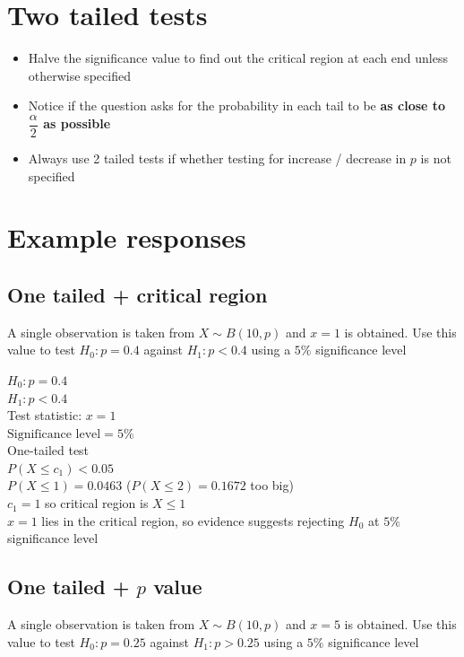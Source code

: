 \documentclass[oneside,fleqn,11pt]{book}
\begin{document}
	\section{Two tailed tests}
	\begin{itemize}
		\item Halve the significance value to find out the critical region at each end unless otherwise specified
		\item Notice if the question asks for the probability in each tail to be \textbf{as close to $\dfrac{\alpha}{2}$ as possible}
		\item Always use 2 tailed tests if whether testing for increase / decrease in $p$ is not specified
	\end{itemize}
	
	\section{Example responses}
	\subsection{One tailed + critical region}
	\begin{example}
		A single observation is taken from $X\sim B(10, p)$ and $x=1$ is obtained. Use this value to test $H_0: p=0.4$ against $H_1:p<0.4$ using a $5\%$ significance level
	\end{example}
	
	\begin{solution}
		$H_0: p=0.4$\\
		$H_1:p<0.4$\\
		Test statistic: $x=1$\\
		$\text{Significance level} = 5\%$\\
		One-tailed test\\
		$P(X \leq c_1) < 0.05$\\
		$P(X \leq 1) = 0.0463$ ($P(X \leq 2) = 0.1672$ too big)\\
		$c_1 = 1$ so critical region is $X\leq 1$\\
		$x=1$ lies in the critical region, so evidence suggests rejecting $H_0$ at $5\%$ significance level
	\end{solution}
	
	\subsection{One tailed + $p$ value}
	\begin{example}
		A single observation is taken from $X\sim B(10, p)$ and $x=5$ is obtained. Use this value to test $H_0: p=0.25$ against $H_1:p>0.25$ using a $5\%$ significance level
	\end{example}
	
\end{document}
